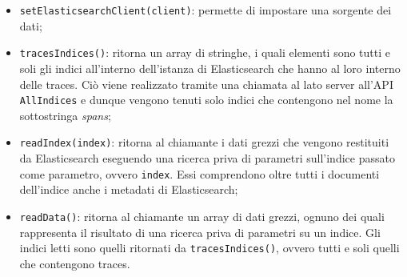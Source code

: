\begin{itemize}
	\item \texttt{setElasticsearchClient(client)}: permette di impostare una sorgente dei dati;
	\item \texttt{tracesIndices()}: ritorna un array di stringhe, i quali elementi sono tutti e soli gli indici all'interno dell'istanza di Elasticsearch che hanno al loro interno delle traces. Ciò viene realizzato tramite una chiamata al lato server all'API \texttt{AllIndices} e dunque vengono tenuti solo indici che contengono nel nome la sottostringa \emph{spans};
	\item \texttt{readIndex(index)}: ritorna al chiamante i dati grezzi che vengono restituiti da Elasticsearch eseguendo una ricerca priva di parametri sull'indice passato come parametro, ovvero \texttt{index}. Essi comprendono oltre tutti i documenti dell'indice anche i metadati di Elasticsearch;
	\item \texttt{readData()}: ritorna al chiamante un array di dati grezzi, ognuno dei quali rappresenta il risultato di una ricerca priva di parametri su un indice. Gli indici letti sono quelli ritornati da \texttt{tracesIndices()}, ovvero tutti e soli quelli che contengono traces.


\end{itemize}



